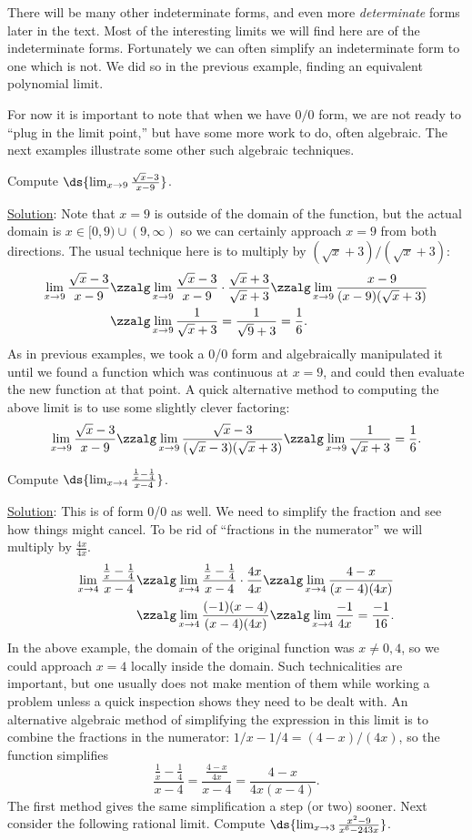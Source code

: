 There will be many other indeterminate forms, and even
more {\it determinate} forms later in the text.
Most of the interesting limits we will find here are
of the indeterminate forms.  Fortunately we can often
simplify an indeterminate form to one which is not.
We did so in the previous example, finding an
equivalent polynomial limit.  


For now it is important to note that when we have $0/0$ form,
we are not ready to ``plug in the limit point,'' but have
some more work to do, often algebraic. 
The next examples illustrate some 
other such algebraic techniques.

\bex Compute $\ds{\lim_{x\to9}\frac{\sqrt{x}-3}{x-9}}$.

\underline{Solution}: Note that $x=9$ is outside of 
the domain of the function, but the actual domain is
$x\in[0,9)\cup(9,\infty)$ so we can certainly approach
$x=9$ from both directions.  The usual technique here
is to multiply by $(\sqrt{x}+3)/(\sqrt{x}+3)$:
\begin{align*}\lim_{x\to9}\frac{\sqrt{x}-3}{x-9}
&\zzalg 
\lim_{x\to9}\frac{\sqrt{x}-3}{x-9}\cdot\frac{\sqrt{x}+3}{\sqrt{x}+3}
\zzalg
\lim_{x\to9}\frac{x-9}{(x-9)(\sqrt{x}+3)}
\\ &\zzalg\lim_{x\to9}\frac1{\sqrt{x}+3}
=\frac1{\sqrt9+3}=\frac16.
\end{align*}
\eex
As in previous examples, we took a 0/0 form and algebraically
manipulated it until we found a function which was continuous
at $x=9$, and could then evaluate the new function at that point.
A quick alternative method to computing the above limit is 
to use some slightly clever factoring:
$$\lim_{x\to9}\frac{\sqrt{x}-3}{x-9}\zzalg
\lim_{x\to9}\frac{\sqrt{x}-3}{(\sqrt{x}-3)(\sqrt{x}+3)}
\zzalg\lim_{x\to9}\frac1{\sqrt{x}+3}=\frac16.$$

\bex Compute $\ds{\lim_{x\to4}\frac{\frac1x-\frac14}{x-4}}$.

\underline{Solution}: This is of form 0/0 as well.  We need
to simplify the fraction and see how things might cancel.
To be rid of ``fractions in the numerator'' we will 
multiply by $\frac{4x}{4x}$.
\begin{align*} \lim_{x\to4}\frac{\frac1x-\frac14}{x-4}
&\zzalg
\lim_{x\to4}\frac{\frac1x-\frac14}{x-4}\cdot\frac{4x}{4x}
\zzalg\lim_{x\to4}\frac{4-x}{(x-4)(4x)}\\
&\zzalg
\lim_{x\to4}\frac{(-1)(x-4)}{(x-4)(4x)}
\zzalg\lim_{x\to4}\frac{-1}{4x}=\frac{-1}{16}.
\end{align*}
\eex
In the above example, the domain of the original function
was $x\ne0,4$, so we could approach $x=4$ locally inside the
domain.  Such technicalities are important, but one usually
does not make mention of them while working a problem unless
a quick inspection shows they need to be dealt with.
An alternative algebraic method of simplifying
the expression in this limit is to combine the fractions in the
numerator: $1/x-1/4=(4-x)/(4x)$, so the function simplifies
$$\frac{\frac{1}x-\frac14}{x-4}=\frac{\frac{4-x}{4x}}{x-4}
=\frac{4-x}{4x(x-4)}.$$
The first method gives the same simplification
a step (or two) sooner.
Next consider the following rational limit.
\bex Compute $\ds{\lim_{x\to3}\frac{x^2-9}{x^6-243x}}$.

